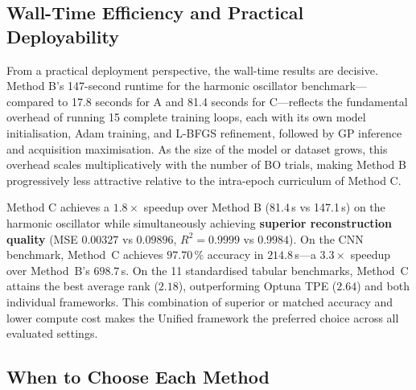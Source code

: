 \documentclass[12pt,a4paper]{article}
\begin{document}
\subsection{Wall-Time Efficiency and Practical Deployability}

From a practical deployment perspective, the wall-time results are
decisive.  Method B's 147-second runtime for the harmonic oscillator
benchmark---compared to 17.8 seconds for A and 81.4 seconds for C---reflects
the fundamental overhead of running 15 complete training loops, each
with its own model initialisation, Adam training, and L-BFGS refinement,
followed by GP inference and acquisition maximisation.  As the size of
the model or dataset grows, this overhead scales multiplicatively with
the number of BO trials, making Method B progressively less attractive
relative to the intra-epoch curriculum of Method C.

Method C achieves a $1.8\times$ speedup over Method B (81.4\,s vs
147.1\,s) on the harmonic oscillator while simultaneously achieving
\textbf{superior reconstruction quality} (MSE $0.00327$ vs $0.09896$,
$R^2 = 0.9999$ vs $0.9984$).  On the CNN benchmark, Method~C achieves
$97.70\,\%$ accuracy in $214.8$\,s---a $3.3\times$ speedup over
Method~B's $698.7$\,s.  On the 11 standardised tabular benchmarks,
Method~C attains the best average rank ($2.18$), outperforming
Optuna TPE ($2.64$) and both individual frameworks.  This combination
of superior or matched accuracy and lower compute cost makes the Unified
framework the preferred choice across all evaluated settings.

\subsection{When to Choose Each Method}
\end{document}

